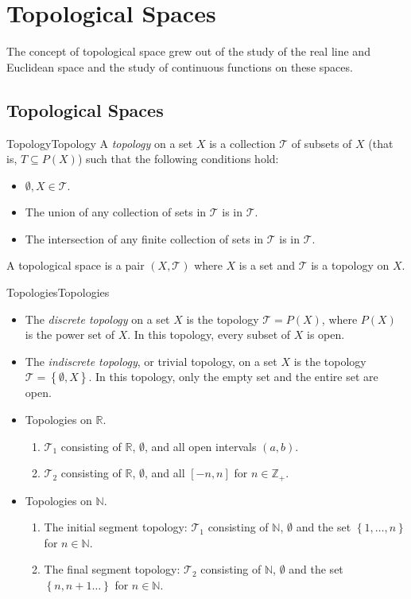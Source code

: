\documentclass[../main.tex]{subfiles}
\begin{document}
\chapter{Topological Spaces}

The concept of topological space grew out of the study of the real line and Euclidean space and the study of continuous functions on these spaces.

\section{Topological Spaces}

\begin{definition}{Topology}{Topology}
	A \emph{topology} on a set $X$ is a collection $\mathcal{T}$ of subsets of $X$ (that is, $T \subseteq P(X)$) such that the following conditions hold:
\begin{itemize}
\item $\emptyset, X \in \mathcal{T}$.
\item The union of any collection of sets in $\mathcal{T}$ is in $\mathcal{T}$.
\item The intersection of any finite collection of sets in $\mathcal{T}$ is in $\mathcal{T}$.
\end{itemize}

A topological space is a pair $(X, \mathcal{T})$ where $X$ is a set and $\mathcal{T}$ is a topology on $X$.
\end{definition}

\begin{example}{Topologies}{Topologies}
\begin{itemize}
\item The \emph{discrete topology} on a set $X$ is the topology $\mathcal{T} = P(X)$, where $P(X)$ is the power set of $X$. In this topology, every subset of $X$ is open.
\item The \emph{indiscrete topology}, or trivial topology, on a set $X$ is the topology $\mathcal{T} = \left\{ \emptyset , X \right\}$. In this topology, only the empty set and the entire set are open.
\item Topologies on $\mathbb{R}$.
	\begin{enumerate}
		\item $\mathcal{T}_1$ consisting of $\mathbb{R}$, $\emptyset $, and all open intervals $(a,b)$.
		\item $\mathcal{T}_2$ consisting of $\mathbb{R}$, $\emptyset $, and all $\left[-n,n\right]$ for $n\in \mathbb{Z}_+$.
	\end{enumerate}
\item Topologies on $\mathbb{N}$.
	\begin{enumerate}
		\item The initial segment topology: $\mathcal{T}_1$ consisting of $\mathbb{N}$, $\emptyset $ and the set $\left\{ 1, \ldots ,n \right\}$ for $n\in \mathbb{N}$.
		\item The final segment topology: $\mathcal{T}_2$ consisting of $\mathbb{N}$, $\emptyset $ and the set $\left\{ n, n+1 \ldots  \right\}$ for $n\in \mathbb{N}$.
	\end{enumerate}
\end{itemize}
\end{example}
\end{document}
